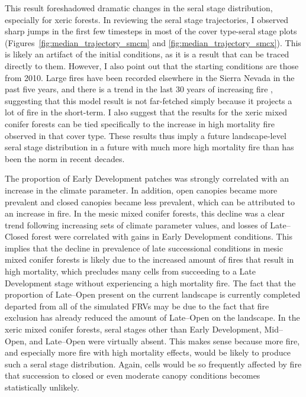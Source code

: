 This result foreshadowed dramatic changes in the seral stage distribution, especially for xeric forests. In reviewing the seral stage trajectories, I observed sharp jumps in the first few timesteps in most of the cover type-seral stage plots (Figures~\ref{fig:median_trajectory_smcm} and \ref{fig:median_trajectory_smcx}). This is likely an artifact of the initial conditions, as it is a result that can be traced directly to them. However, I also point out that the starting conditions are those from 2010. Large fires have been recorded elsewhere in the Sierra Nevada in the past five years, and there is a trend in the last 30 years of increasing fire \citep{Miller2012}, suggesting that this model result is not far-fetched simply because it projects a lot of fire in the short-term. I also suggest that the results for the xeric mixed conifer forests can be tied specifically to the increase in high mortality fire observed in that cover type. These results thus imply a future landscape-level seral stage distribution in a future with much more high mortality fire than has been the norm in recent decades.

The proportion of Early Development patches was strongly correlated with an increase in the climate parameter. In addition, open canopies became more prevalent and closed canopies became less prevalent, which can be attributed to an increase in fire. In the mesic mixed conifer forests, this decline was a clear trend following increasing sets of climate parameter values, and losses of Late--Closed forest were correlated with gains in Early Development conditions. This implies that the decline in prevalence of late successional conditions in mesic mixed conifer forests is likely due to the increased amount of fires that result in high mortality, which precludes many cells from succeeding to a Late Development stage without experiencing a high mortality fire. The fact that the proportion of Late--Open present on the current landscape is currently completed departed from all of the simulated FRVs may be due to the fact that fire exclusion has already reduced the amount of Late--Open on the landscape. In the xeric mixed conifer forests, seral stages other than Early Development, Mid--Open, and Late--Open were virtually absent. This makes sense because more fire, and especially more fire with high mortality effects, would be likely to produce such a seral stage distribution. Again, cells would be so frequently affected by fire that succession to closed or even moderate canopy conditions becomes statistically unlikely.

